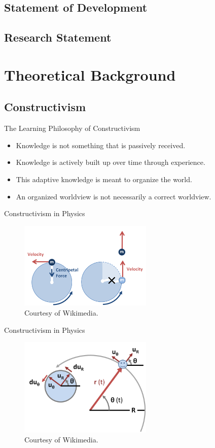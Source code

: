 \documentclass{beamer}
\begin{document}
\subsection*{Statement of Development}
\subsection*{Research Statement}

\section{Theoretical Background}

\subsection*{Constructivism}

\begin{frame}{The Learning Philosophy of Constructivism}
\begin{itemize}
\item Knowledge is not something that is passively received.
\item Knowledge is actively built up over time through experience.
\item This adaptive knowledge is meant to organize the world.
\item An organized worldview is not necessarily a correct worldview.
\end{itemize}
\end{frame}

\begin{frame}{Constructivism in Physics}
  \begin{figure}
  \centering
    \includegraphics[width=2.5in]{img/presentation/ucm_string}
    \caption{Courtesy of Wikimedia.}
  \end{figure}
\end{frame}

\begin{frame}{Constructivism in Physics}
  \begin{figure}
  \centering
    \includegraphics[width=2.5in]{img/presentation/vectors}
    \caption{Courtesy of Wikimedia.}
  \end{figure}
\end{frame}
\end{document}
